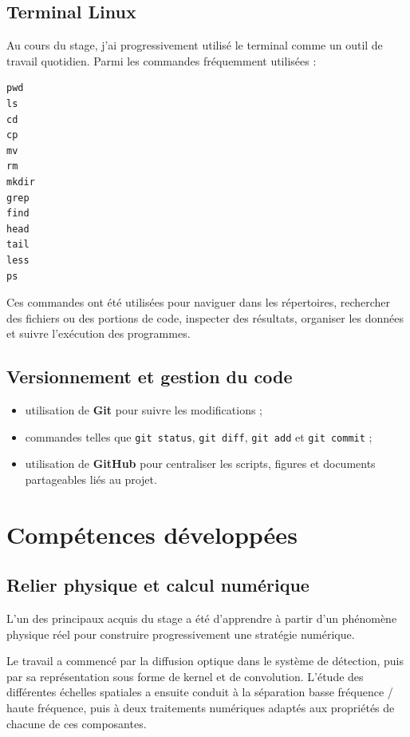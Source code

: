 \documentclass[11pt,a4paper]{report}
\begin{document}
\subsection{Terminal Linux}

Au cours du stage, j'ai progressivement utilisé le terminal comme un outil
de travail quotidien. Parmi les commandes fréquemment utilisées :

\begin{verbatim}
pwd
ls
cd
cp
mv
rm
mkdir
grep
find
head
tail
less
ps
\end{verbatim}

Ces commandes ont été utilisées pour naviguer dans les répertoires,
rechercher des fichiers ou des portions de code, inspecter des résultats,
organiser les données et suivre l'exécution des programmes.

\subsection{Versionnement et gestion du code}

\begin{itemize}
    \item utilisation de \textbf{Git} pour suivre les modifications ;
    
    \item commandes telles que \texttt{git status}, \texttt{git diff},
    \texttt{git add} et \texttt{git commit} ;
    
    \item utilisation de \textbf{GitHub} pour centraliser les scripts,
    figures et documents partageables liés au projet.
\end{itemize}



\section{Compétences développées}

\subsection{Relier physique et calcul numérique}

L'un des principaux acquis du stage a été d'apprendre à partir d'un
phénomène physique réel pour construire progressivement une stratégie
numérique.

Le travail a commencé par la diffusion optique dans le système de détection,
puis par sa représentation sous forme de kernel et de convolution. L'étude
des différentes échelles spatiales a ensuite conduit à la séparation basse
fréquence / haute fréquence, puis à deux traitements numériques adaptés aux
propriétés de chacune de ces composantes.
\end{document}

